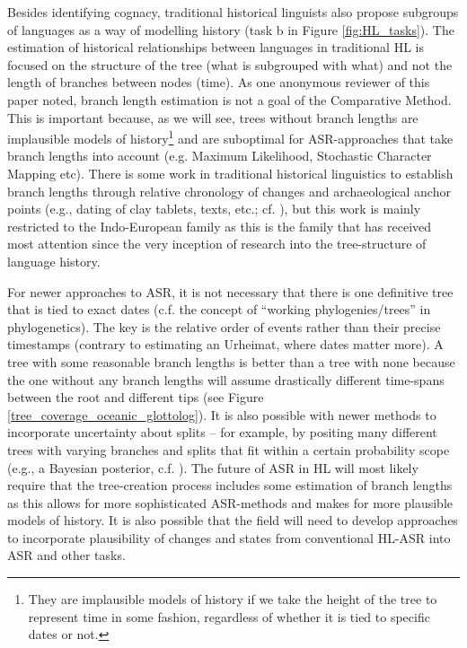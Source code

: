 \documentclass[12pt,letterpaper]{article}
\begin{document}
Besides identifying cognacy, traditional historical linguists also propose subgroups of languages as a way of modelling history (task b in Figure \ref{fig:HL_tasks}). The estimation of historical relationships between languages in traditional HL is focused on the structure of the tree (what is subgrouped with what) and not the length of branches between nodes (time). As one anonymous reviewer of this paper noted, branch length estimation is not a goal of the Comparative Method. This is important because, as we will see, trees without branch lengths are implausible models of history\footnote{They are implausible models of history if we take the height of the tree to represent time in some fashion, regardless of whether it is tied to specific dates or not.} and are suboptimal for ASR-approaches that take branch lengths into account (e.g. Maximum Likelihood, Stochastic Character Mapping etc). There is some work in traditional historical linguistics to establish branch lengths through relative chronology of changes and archaeological anchor points (e.g., dating of clay tablets, texts, etc.; cf. \citealt{pereltsvaig2015indo_dates}), but this work is mainly restricted to the Indo-European family as this is the family that has received most attention since the very inception of research into the tree-structure of language history. 

For newer approaches to ASR, it is not necessary that there is one definitive tree that is tied to exact dates (c.f. the concept of ``working phylogenies/trees'' in phylogenetics). The key is the relative order of events rather than their precise timestamps (contrary to estimating an Urheimat, where dates matter more). A tree with some reasonable branch lengths is better than a tree with none because the one without any branch lengths will assume drastically different time-spans between the root and different tips (see Figure \ref{tree_coverage_oceanic_glottolog}). It is also possible with newer methods to incorporate uncertainty about splits -- for example, by positing many different trees with varying branches and splits that fit within a certain probability scope (e.g., a Bayesian posterior, c.f. \citealt[7]{goldstein_2022}). The future of ASR in HL will most likely require that the tree-creation process includes some estimation of branch lengths as this allows for more sophisticated ASR-methods and makes for more plausible models of history. It is also possible that the field will need to develop approaches to  incorporate plausibility of changes and states from conventional HL-ASR into ASR and other tasks.
\end{document}
